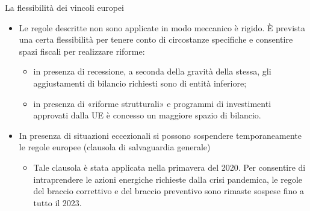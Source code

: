 \documentclass[aspectratio=149,11pt,italian]{beamer}
\begin{document}
\begin{frame}{La flessibilità dei vincoli europei}

  \begin{itemize}
  \item Le regole descritte non sono applicate in modo meccanico è rigido. È
    prevista una certa flessibilità per tenere conto di circostanze specifiche
    e consentire spazi fiscali per realizzare riforme:
    \begin{itemize}
    \item in presenza di recessione, a seconda della gravità della stessa, gli
      aggiustamenti di bilancio richiesti sono di entità inferiore;
    \item in presenza di «riforme strutturali» e programmi di investimenti
      approvati dalla UE è concesso un maggiore spazio di bilancio.
    \end{itemize}
  \item In presenza di situazioni eccezionali si possono sospendere
    temporaneamente le regole europee (\alert{clausola di salvaguardia
      generale})
    \begin{itemize}
    \item Tale clausola è stata applicata nella primavera del 2020. Per
      consentire di intraprendere le azioni energiche richieste dalla crisi
      pandemica, le regole del braccio correttivo e del braccio preventivo
      sono rimaste sospese fino a tutto il 2023.
    \end{itemize}
  \end{itemize}
\end{frame}
\end{document}

